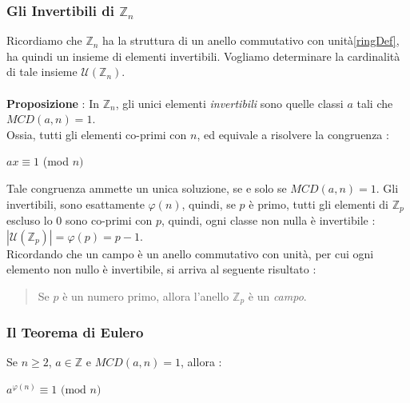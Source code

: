 \documentclass[12pt, letterpaper]{article}
\begin{document}
\subsubsection{Gli Invertibili di \(\mathbb{Z}_n\)} \label{invZn}
Ricordiamo che \(\mathbb{Z}_n\) ha la struttura di un anello commutativo con unità\ref{ringDef}, ha quindi un insieme di 
elementi invertibili. Vogliamo determinare la cardinalità di tale insieme \(\mathcal{U}(\mathbb{Z}_n)\).
\\\hphantom{.}\\\textbf{Proposizione }: In \(\mathbb{Z}_n\), gli unici elementi \textit{invertibili} sono 
quelle classi \(a\) tali che \(MCD(a,n)=1\). \\
Ossia, tutti gli elementi co-primi con \(n\), ed equivale a risolvere la congruenza :\begin{center}
    \(ax\equiv 1 \) (mod \(n)\)
\end{center} Tale congruenza ammette un unica soluzione, se e solo se \(MCD(a,n)=1\). Gli 
invertibili, sono esattamente 
\(\varphi(n)\), quindi, se \(p\) è primo, tutti gli elementi di \(\mathbb{Z}_p\) escluso lo 0 sono co-primi con \(p\), quindi,
ogni classe non nulla è invertibile : \(|\mathcal{U}(\mathbb{Z}_p)|=\varphi(p)=p-1\). \\ 
Ricordando che un campo è un anello commutativo con unità, per cui ogni elemento non nullo è invertibile, 
si arriva al seguente risultato :\begin{quote}
    \begin{center}
        Se \(p\) è un numero primo, allora l'anello \(\mathbb{Z}_p\) è un \textit{campo}.
    \end{center}
\end{quote}
\subsubsection{Il Teorema di Eulero}
Se \(n\ge 2\), \(a\in \mathbb{Z}\) e \(MCD(a,n)=1\), allora :\begin{center}
    \(a^{\varphi(n)}\equiv 1 \text{ (mod }n\text{)}\)
\end{center}
\end{document}
